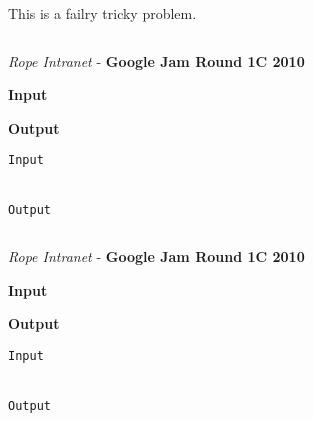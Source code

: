 \begin{solution}
	
This is a failry tricky problem.
	\begin{lstlisting}[language=c++, caption="Store credit c++ solution"]


	\end{lstlisting}
\end{solution}




\begin{problem}{\textit{Rope Intranet} - \textbf{Google Jam Round 1C 2010}}




\textbf{Input}


\textbf{Output}


\begin{framed}
	\begin{verbatim}
Input 


Output 

	\end{verbatim}
\end{framed}

\end{problem}

\begin{solution}
	
	\begin{lstlisting}[language=c++, caption="Store credit c++ solution"]


	\end{lstlisting}
\end{solution}



\begin{problem}{\textit{Rope Intranet} - \textbf{Google Jam Round 1C 2010}}




\textbf{Input}


\textbf{Output}


\begin{framed}
	\begin{verbatim}
Input 


Output 

	\end{verbatim}
\end{framed}

\end{problem}

\begin{solution}
	
	\begin{lstlisting}[language=c++, caption="Store credit c++ solution"]


	\end{lstlisting}
\end{solution}



